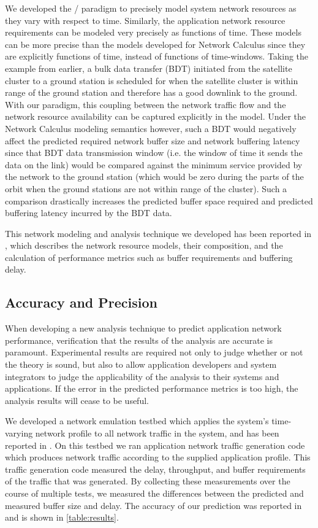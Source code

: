 We developed the \shorttool/ paradigm to precisely
model system network resources as they vary with respect to time.
Similarly, the application network resource requirements can be
modeled very precisely as functions of time.  These models can be more
precise than the models developed for Network Calculus since they are
explicitly functions of time, instead of functions of time-windows.
Taking the example from earlier, a bulk data transfer (BDT) initiated
from the satellite cluster to a ground station is scheduled for when
the satellite cluster is within range of the ground station and
therefore has a good downlink to the ground.  With our paradigm, this
coupling between the network traffic flow and the network resource
availability can be captured explicitly in the model.  Under the
Network Calculus modeling semantics however, such a BDT would
negatively affect the predicted required network buffer size and
network buffering latency since that BDT data transmission window
(i.e. the window of time it sends the data on the link) would be
compared against the minimum service provided by the network to the
ground station (which would be zero during the parts of the orbit when
the ground stations are not within range of the cluster).  Such a
comparison drastically increases the predicted buffer space required
and predicted buffering latency incurred by the BDT data.

This network modeling and analysis technique we developed has been
reported in \cite{ISIS_F6_CYPHY:14}, which describes the network
resource models, their composition, and the calculation of performance
metrics such as buffer requirements and buffering delay.

\subsection{Accuracy and Precision}
\label{subsec:precision}

When developing a new analysis technique to predict application
network performance, verification that the results of the analysis are
accurate is paramount.  Experimental results are required not only to
judge whether or not the theory is sound, but also to allow
application developers and system integrators to judge the
applicability of the analysis to their systems and applications.  If
the error in the predicted performance metrics is too high, the
analysis results will cease to be useful.

We developed a network emulation testbed which applies the system's
time-varying network profile to all network traffic in the system, and
has been reported in \cite{ISIS_F6_CYPHY:14}.  On this testbed we ran
application network traffic generation code which produces network
traffic according to the supplied application profile.  This traffic
generation code measured the delay, throughput, and buffer
requirements of the traffic that was generated.  By collecting these
measurements over the course of multiple tests, we measured the
differences between the predicted and measured buffer size and delay.
The accuracy of our prediction was reported in
\cite{ISIS_F6_CYPHY:14} and is shown in \ref{table:results}.

